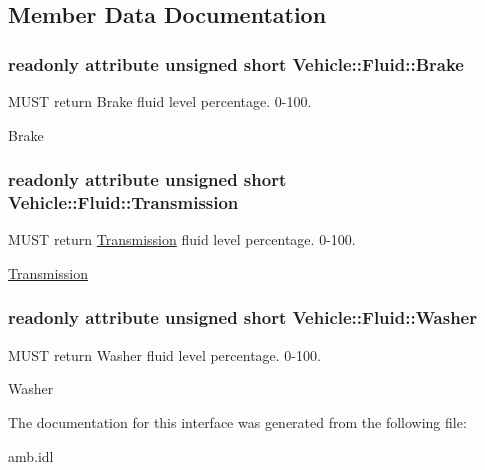 \subsection{Member Data Documentation}
\hypertarget{interfaceVehicle_1_1Fluid_af8143827fe7cbb348f5e127e00d3bf61}{
\subsubsection[{Brake}]{\setlength{\rightskip}{0pt plus 5cm}readonly attribute unsigned short Vehicle\-::\-Fluid\-::\-Brake}}\label{interfaceVehicle_1_1Fluid_af8143827fe7cbb348f5e127e00d3bf61}


M\-U\-S\-T return Brake fluid level percentage. 0-\/100. 

Brake \hypertarget{interfaceVehicle_1_1Fluid_a5b4f0e96ac48825118ff67bb5b3395f9}{
\subsubsection[{Transmission}]{\setlength{\rightskip}{0pt plus 5cm}readonly attribute unsigned short Vehicle\-::\-Fluid\-::\-Transmission}}\label{interfaceVehicle_1_1Fluid_a5b4f0e96ac48825118ff67bb5b3395f9}


M\-U\-S\-T return \hyperlink{interfaceVehicle_1_1Transmission}{Transmission} fluid level percentage. 0-\/100. 

\hyperlink{interfaceVehicle_1_1Transmission}{Transmission} \hypertarget{interfaceVehicle_1_1Fluid_af75b190a62ab4b5f1a6de1e94de91520}{
\subsubsection[{Washer}]{\setlength{\rightskip}{0pt plus 5cm}readonly attribute unsigned short Vehicle\-::\-Fluid\-::\-Washer}}\label{interfaceVehicle_1_1Fluid_af75b190a62ab4b5f1a6de1e94de91520}


M\-U\-S\-T return Washer fluid level percentage. 0-\/100. 

Washer 

The documentation for this interface was generated from the following file\-:\begin{DoxyCompactItemize}
\item 
amb.\-idl\end{DoxyCompactItemize}
